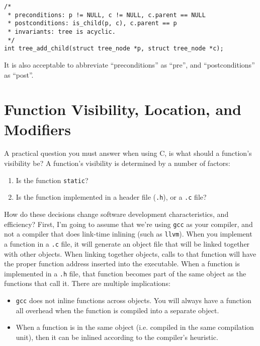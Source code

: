 \documentclass[11pt,onecolumn]{article}
\begin{document}
\begin{itemize}[itemsep=0pt,topsep=1pt,parsep=1pt,leftmargin=2.5em]
    \begin{minipage}{3in}
      \footnotesize
      \lstset{language=C}
      \begin{lstlisting}
/*
 * preconditions: p != NULL, c != NULL, c.parent == NULL
 * postconditions: is_child(p, c), c.parent == p
 * invariants: tree is acyclic.
 */
int tree_add_child(struct tree_node *p, struct tree_node *c);
      \end{lstlisting}
    \end{minipage}
\end{itemize}

  It is also acceptable to abbreviate ``preconditions'' as ``pre'',
  and ``postconditions'' as ``post''.

\section{Function Visibility, Location, and Modifiers}
\label{s:visibility}

A practical question you must answer when using C, is what should a
function's visibility be?  A function's visibility is determined by a
number of factors:
\begin{enumerate}[itemsep=0pt,topsep=1pt,parsep=1pt,leftmargin=2.5em]
\item Is the function {\tt static}?
\item Is the function implemented in a header file ({\tt *.h}), or a
  {\tt *.c} file?
\end{enumerate}

How do these decisions change software development characteristics,
and efficiency?  First, I'm going to assume that we're using {\tt gcc}
as your compiler, and not a compiler that does link-time inlining
(such as {\tt llvm}).  When you implement a function in a {\tt *.c}
file, it will generate an object file that will be linked together
with other objects.  When linking together objects, calls to that
function will have the proper function address inserted into the
executable.  When a function is implemented in a {\tt *.h} file, that
function becomes part of the same object as the functions that call
it.  There are multiple implications:
\begin{itemize}[itemsep=0pt,topsep=1pt,parsep=1pt,leftmargin=2.5em]
\item {\tt gcc} does not inline functions across objects.  You will
  always have a function all overhead when the function is compiled
  into a separate object.
\item When a function is in the same object (i.e. compiled in the same
  compilation unit), then it can be inlined according to the
  compiler's heuristic.
\end{itemize}
\end{document}
